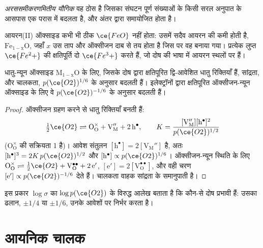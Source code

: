 \begin{definition}\label{def:b3:solid-state:non-stoichiometric}
\emph{अरससमीकरणमितीय यौगिक} वह
ठोस है जिसका संघटन पूर्ण संख्याओं के किसी सरल अनुपात के आसपास एक परास में
बदलता है, और अंतर  द्वारा समायोजित होता है।
\end{definition}

आयरन(II) ऑक्साइड कभी भी ठीक $\ce{FeO}$ नहीं होता: उसमें सदैव आयरन की कमी होती है,
$\mathrm{Fe_{1-x}O}$, जहाँ $x$ उस ताप और ऑक्सीजन दाब से तय होता है जिस पर वह बनाया गया। प्रत्येक लुप्त $\ce{Fe^2+}$ की क्षतिपूर्ति दो
$\ce{Fe^3+}$ करते हैं, जो दोष की भाषा में आयरन स्थलों पर  हैं।

\begin{proposition}[चालकता और ऑक्सीजन दाब]\label{prop:b3:solid-state:brouwer}
धातु-न्यून ऑक्साइड $\mathrm{M_{1-x}O}$ के लिए, जिसके दोष  द्वारा क्षतिपूरित द्वि-आवेशित धातु रिक्तियाँ हैं,
 सांद्रता, और चालकता,
$p(\ce{O2})^{1/6}$ के अनुसार बदलती हैं। इलेक्ट्रॉनों द्वारा क्षतिपूरित ऑक्सीजन-न्यून ऑक्साइड के लिए वे
$p(\ce{O2})^{-1/6}$ के अनुसार बदलती हैं।
\end{proposition}

\begin{proof}
ऑक्सीजन ग्रहण करने से धातु रिक्तियाँ बनती हैं:
\[
  \tfrac12\ce{O2} \rightleftharpoons \mathrm{O_O^{\times} + V_M'' + 2\,h^{\bullet}}, \qquad K = \frac{[\mathrm{V_M''}][\mathrm h^\bullet]^2}{p(\ce{O2})^{1/2}}
\]
($\mathrm{O_O^{\times}}$ की सक्रियता 1 है)।
आवेश संतुलन $[\mathrm h^\bullet] = 2[\mathrm{V_M''}]$ है, अतः $[\mathrm h^\bullet]^3 = 2K\,p(\ce{O2})^{1/2}$ और $[\mathrm h^\bullet] \propto p(\ce{O2})^{1/6}$।
ऑक्सीजन-न्यून स्थिति के लिए $\mathrm{O_O^{\times}} \rightleftharpoons \tfrac12\ce{O2} + \mathrm{V_O^{\bullet\bullet} + 2\,e'}$, $[\mathrm e'] = 2[\mathrm{V_O^{\bullet\bullet}}]$, और वही चरण $[\mathrm e'] \propto p(\ce{O2})^{-1/6}$ देते हैं।
चालकता वाहक सांद्रता के समानुपाती है।
\end{proof}

इस प्रकार $\log\sigma$ का $\log p(\ce{O2})$ के विरुद्ध आलेख बताता है कि कौन-से दोष प्रभावी हैं: उसका ढलान,
$\pm 1/4$ या $\pm 1/6$, उनके आवेशों पर निर्भर करता है।

\section{आयनिक चालक}

